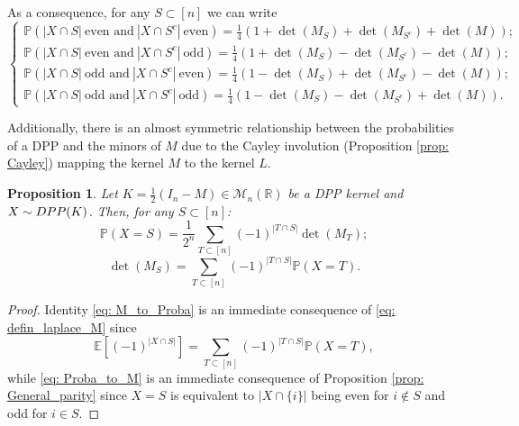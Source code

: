 \documentclass{article}
\numberwithin{equation}{section}
\newcommand{\bE}{\mathbb{E}}
\newcommand{\bP}{\mathbb{P}}
\newcommand{\bR}{\mathbb{R}}
\newcommand{\DPP}{\textnormal{DPP}}
\theoremstyle{plain}
\newtheorem{proposition}{Proposition}[section]
\begin{document}
\noindent As a consequence, for any $S\subset [n]$ we can write
\[\left\{\begin{array}{l}
\bP(|X\cap S|~\mbox{even and}~|X\cap S^c|~\mbox{even})=\frac{1}{4}\left(1+\det(M_S)+\det(M_{S^c})+\det(M)\right);\\
\bP(|X\cap S|~\mbox{even and}~|X\cap S^c|~\mbox{odd})=\frac{1}{4}\left(1+\det(M_S)-\det(M_{S^c})-\det(M)\right);\\
\bP(|X\cap S|~\mbox{odd and}~|X\cap S^c|~\mbox{even})=\frac{1}{4}\left(1-\det(M_S)+\det(M_{S^c})-\det(M)\right);\\
\bP(|X\cap S|~\mbox{odd and}~|X\cap S^c|~\mbox{odd})=\frac{1}{4}\left(1-\det(M_S)-\det(M_{S^c})+\det(M)\right).
\end{array}\right.\]

\noindent Additionally, there is an almost symmetric relationship between the probabilities of a DPP and the minors of $M$ due to the Cayley involution (Proposition \ref{prop: Cayley}) mapping the kernel $M$ to the kernel $L$.

\begin{proposition}
Let $K=\frac{1}{2}(I_n-M)\in\mathcal{M}_n(\bR)$ be a DPP kernel and $X\sim \DPP(K)$. Then, for any $S\subset [n]$:
\begin{equation}\label{eq: Proba_to_M}
\mathbb{P}(X=S)=\frac{1}{2^n}\sum_{T \subset [n]}(-1)^{|T \cap S|}\det(M_T);
\end{equation}
\begin{equation}\label{eq: M_to_Proba}
\det(M_S)=\sum_{T \subset [n]}(-1)^{|T \cap S|}\mathbb{P}(X=T).
\end{equation}
\end{proposition}
\begin{proof}
Identity \eqref{eq: M_to_Proba} is an immediate consequence of \eqref{eq: defin_laplace_M} since
\[\bE\left[(-1)^{|X\cap S|}\right]=\sum_{T \subset [n]}(-1)^{|T \cap S|}\mathbb{P}(X=T),\]
while \eqref{eq: Proba_to_M} is an immediate consequence of Proposition \ref{prop: General_parity} since $X=S$ is equivalent to $|X\cap\{i\}|$ being even for $i\notin S$ and odd for $i\in S$.
\end{proof}
\end{document}

